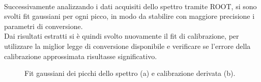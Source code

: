 \documentclass[11pt]{article} %
\begin{document}
\\Successivamente analizzando i dati acquisiti dello spettro tramite ROOT, si sono svolti fit gaussiani per ogni picco, in modo da stabilire con maggiore precisione i parametri di conversione.\\
Dai risultati estratti si è quindi svolto nuovamente il fit di calibrazione, per utilizzare la miglior legge di conversione disponibile e verificare se l'errore della calibrazione approssimata risultasse significativo.
\begin{figure}[!h]
\centering
\caption{Fit gaussiani dei picchi dello spettro (a) e calibrazione derivata (b).}
\end{figure}
\\
\end{document}
